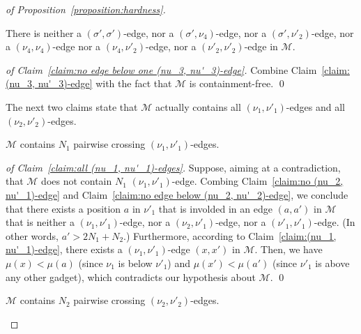 \begin{proof}[of Proposition~\ref{proposition:hardness}]
  \begin{claim}
    \label{claim:no edge below one (nu_3, nu'_3)-edge}
    There is
    neither a $(\sigma', \sigma')$-edge,
    nor a $(\sigma', \nu_4)$-edge,
    nor a $(\sigma', \nu'_2)$-edge,
    nor a $(\nu_4, \nu_4)$-edge
    nor a $(\nu_4, \nu'_2)$-edge,
    nor a $(\nu'_2, \nu'_2)$-edge
    in $\mathcal{M}$.
  \end{claim}

  \begin{proof}[of Claim~\ref{claim:no edge below one (nu_3, nu'_3)-edge}]
    Combine Claim~\ref{claim:(nu_3, nu'_3)-edge} with the fact that
    $\mathcal{M}$ is containment-free.
    \qed
  \end{proof}

  The next two claims state that $\mathcal{M}$ actually contains
  all $(\nu_1, \nu'_1)$-edges and all $(\nu_2, \nu'_2)$-edges.

  \begin{claim}
    \label{claim:all (nu_1, nu'_1)-edges}
    $\mathcal{M}$ contains $N_1$ pairwise crossing $(\nu_1, \nu'_1)$-edges.
  \end{claim}

  \begin{proof}[of Claim~\ref{claim:all (nu_1, nu'_1)-edges}]
    Suppose, aiming at a contradiction, that
    $\mathcal{M}$ does not contain $N_1$ $(\nu_1, \nu'_1)$-edge.
    Combing Claim~\ref{claim:no (nu_2, nu'_1)-edge} and
    Claim~\ref{claim:no edge below (nu_2, nu'_2)-edge},
    we conclude that there exists a position $a$ in $\nu'_1$ that is
    involded in an edge $(a, a')$ in $\mathcal{M}$ that is
    neither a $(\nu_1, \nu'_1)$-edge,
    nor a $(\nu_2, \nu'_1)$-edge,
    nor a $(\nu'_1, \nu'_1)$-edge.
    (In other words, $a' > 2N_1 + N_2$.)
    Furthermore, according to Claim~\ref{claim:(nu_1, nu'_1)-edge},
    there exists a $(\nu_1, \nu'_1)$-edge $(x, x')$ in $\mathcal{M}$.
    Then, we have
    $\mu(x) < \mu(a)$ (since $\nu_1$ is below $\nu'_1$) and
    $\mu(x') < \mu(a')$ (since $\nu'_1$ is above any other gadget),
    which contradicts our hypothesis about $\mathcal{M}$.
    \qed
  \end{proof}

  \begin{claim}
    \label{claim:all (nu_2, nu'_2)-edges}
    $\mathcal{M}$ contains $N_2$ pairwise crossing $(\nu_2, \nu'_2)$-edges.
  \end{claim}


\end{proof}
